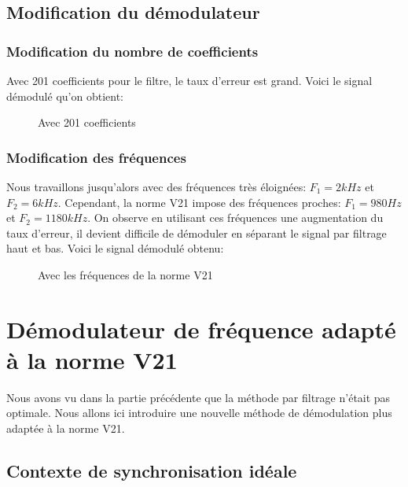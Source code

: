 \documentclass{article}
\begin{document}
\subsection{Modification du démodulateur} 

\subsubsection{Modification du nombre de coefficients}

Avec 201 coefficients pour le filtre, le taux d'erreur est grand.
Voici le signal démodulé qu'on obtient:

\begin{figure}[H]
	\centering
	
	\caption{Avec 201 coefficients}
	\label{fig:201-coefficients}
\end{figure}

\subsubsection{Modification des fréquences}

Nous travaillons jusqu'alors avec des fréquences très éloignées: $F_1=2kHz$ et $F_2=6kHz$. Cependant, la norme V21 impose des fréquences proches: $F_1=980Hz$ et $F_2=1180kHz$. On observe en utilisant ces fréquences une augmentation du taux d'erreur, il devient difficile de démoduler en séparant le signal par filtrage haut et bas.
Voici le signal démodulé obtenu:

\begin{figure}[H]
	\centering
	
	\caption{Avec les fréquences de la norme V21}
	\label{fig:filtrage-avec-v21}
\end{figure}

\section{Démodulateur de fréquence adapté à la norme V21}

Nous avons vu dans la partie précédente que la méthode par filtrage n'était pas optimale. Nous allons ici introduire une nouvelle méthode de démodulation plus adaptée à la norme V21.

\subsection{Contexte de synchronisation idéale}
\label{synchro-ideale}
\end{document}

